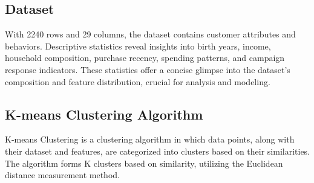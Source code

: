 \documentclass{josis}
\begin{document}
\subsection{Dataset}With 2240 rows and 29 columns, the dataset contains customer attributes and behaviors. Descriptive statistics reveal insights into birth years, income, household composition, purchase recency, spending patterns, and campaign response indicators. These statistics offer a concise glimpse into the dataset's composition and feature distribution, crucial for analysis and modeling.

\subsection{K-means Clustering Algorithm}

K-means Clustering is a clustering algorithm in which data points, along with their dataset and features, are categorized into clusters based on their similarities. The algorithm forms K clusters based on similarity, utilizing the Euclidean distance measurement method.
\end{document}
